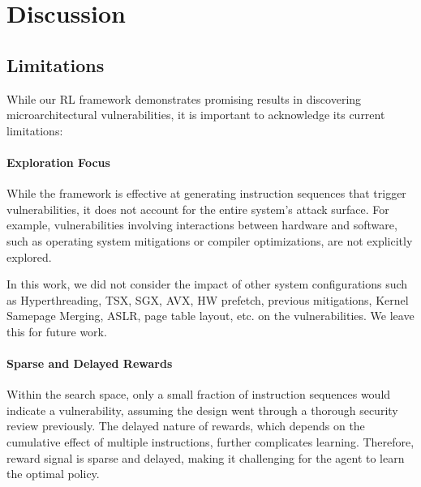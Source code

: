
\section{Discussion}

\subsection{Limitations}

While our RL framework demonstrates promising results in discovering microarchitectural vulnerabilities, it is important to acknowledge its current limitations:

\paragraph{Exploration Focus}
While the framework is effective at generating instruction sequences that trigger vulnerabilities, it does not account for the entire system's attack surface. For example, vulnerabilities involving interactions between hardware and software, such as operating system mitigations or compiler optimizations, are not explicitly explored.

In this work, we did not consider the impact of other system configurations such as Hyperthreading, TSX, SGX, AVX, HW prefetch, previous mitigations, Kernel Samepage Merging, ASLR, page table layout, etc. on the \Mi vulnerabilities. We leave this for future work.


\paragraph{Sparse and Delayed Rewards}
Within the search space, only a small fraction of instruction sequences would indicate a vulnerability, assuming the design went through a thorough security review previously. The delayed nature of rewards, which depends on the cumulative effect of multiple instructions, further complicates learning. Therefore, reward signal is sparse and delayed, making it challenging for the agent to learn the optimal policy.


